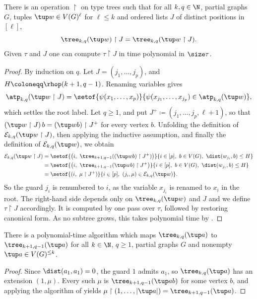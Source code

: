 \begin{lemma}\label{lem:restrict}
There is an operation $\restriction$ on type trees
such that for all \(k,q\in\N\), partial graphs \(G\),
tuples $\tup w\in V(G)^{\ell}$ for $\ell\le k$ and ordered lists $J$ of distinct positions in $[\ell]$,
\[
\tree_{k,q}(\tup w)\restriction J
=
\tree_{k,q}(\tup w\restriction J).
\]
Given $\tau$ and $J$ one can compute $\tau\restriction J$ in time polynomial in $\size\tau$.
\end{lemma}
\begin{proof}
By induction on $q$.
Let $J=(j_1,\ldots,j_p)$, and $H\coloneqq\rhop(k+1,q-1)$.
Renaming variables gives
\[
\atp_{k,q}(\tup w\restriction J)=\setof{\psi(x_1,\ldots,x_p)}{\psi(x_{j_1},\ldots,x_{j_p})\in\atp_{k,q}(\tup w)},
\]
which settles the root label.
Let $q\ge1$, and put $J^+\coloneqq(j_1,\ldots,j_p,\ell+1)$, so that $(\tup w\restriction J)\,b=(\tup w b)\restriction J^+$ for every vertex $b$.
Unfolding the definition of $\mathcal E_{k,q}(\tup w\restriction J)$, then applying the inductive assumption, and finally the definition of $\mathcal E_{k,q}(\tup w)$, we obtain
\begin{align*}
\mathcal E_{k,q}(\tup w\restriction J)
&=\setof{\bigl(i,\ \tree_{k+1,q-1}((\tup w b)\restriction J^+)\bigr)}{i\in[p],\ b\in V(G),\ \dist(w_{j_i},b)\le H}\\
&=\setof{\bigl(i,\ \tree_{k+1,q-1}(\tup w b)\restriction J^+\bigr)}{i\in[p],\ b\in V(G),\ \dist(w_{j_i},b)\le H}\\
&=\setof{(i,\ \mu\restriction J^+)}{i\in[p],\ (j_i,\mu)\in\mathcal E_{k,q}(\tup w)}.
\end{align*}
So the guard $j_i$ is renumbered to $i$, as the variable $x_{j_i}$ is renamed to $x_i$ in the root.
The right-hand side depends only on $\tree_{k,q}(\tup w)$ and $J$ and we define $\tau\restriction J$ accordingly.
It is computed by one pass over $\tau$, followed by restoring canonical form. As no subtree grows, this takes polynomial time by .
\end{proof}

\begin{lemma}\label{lem:shift}
There is a polynomial-time algorithm which maps
$\tree_{k,q}(\tup a)$ to $\tree_{k+1,q-1}(\tup a)$ for all \(k\in\N\), \(q\ge1\),
partial graphs \(G\) and nonempty $\tup a\in V(G)^{\le k}$.
\end{lemma}
\begin{proof}
Since $\dist(a_1,a_1)=0$, the guard $1$ admits $a_1$, so $\tree_{k,q}(\tup a)$ has an extension $(1,\mu)$.
Every such $\mu$ is $\tree_{k+1,q-1}(\tup ab)$ for some vertex $b$, and applying the algorithm of  yields
$\mu\restriction(1,\ldots,|\tup a|)=\tree_{k+1,q-1}(\tup a)$.
\end{proof}

